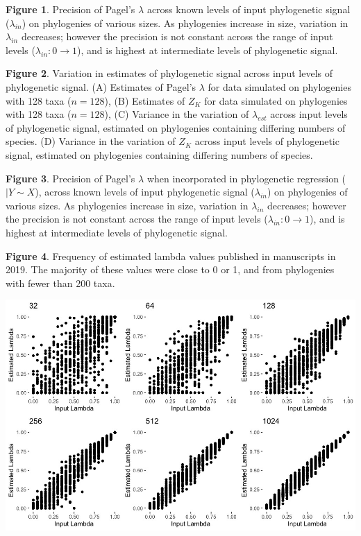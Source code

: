 \documentclass[
]{article}
\begin{document}
\textbf{Figure 1}. Precision of Pagel's \(\lambda\) across known levels
of input phylogenetic signal (\(\lambda_{in}\)) on phylogenies of
various sizes. As phylogenies increase in size, variation in
\(\lambda_{in}\) decreases; however the precision is not constant across
the range of input levels (\(\lambda_{in}: 0 \to 1\)), and is highest at
intermediate levels of phylogenetic signal. \hfill\break

\textbf{Figure 2}. Variation in estimates of phylogenetic signal across
input levels of phylogenetic signal. (A) Estimates of Pagel's
\(\lambda\) for data simulated on phylogenies with 128 taxa (\(n=128\)),
(B) Estimates of \(Z_K\) for data simulated on phylogenies with 128 taxa
(\(n=128\)), (C) Variance in the variation of \(\lambda_{est}\) across
input levels of phylogenetic signal, estimated on phylogenies containing
differing numbers of species. (D) Variance in the variation of \(Z_K\)
across input levels of phylogenetic signal, estimated on phylogenies
containing differing numbers of species. \hfill\break

\textbf{Figure 3}. Precision of Pagel's \(\lambda\) when incorporated in
phylogenetic regression (\(|Y\sim X\)), across known levels of input
phylogenetic signal (\(\lambda_{in}\)) on phylogenies of various sizes.
As phylogenies increase in size, variation in \(\lambda_{in}\)
decreases; however the precision is not constant across the range of
input levels (\(\lambda_{in}: 0 \to 1\)), and is highest at intermediate
levels of phylogenetic signal. \hfill\break

\textbf{Figure 4}. Frequency of estimated lambda values published in
manuscripts in 2019. The majority of these values were close to 0 or 1,
and from phylogenies with fewer than 200 taxa.

\newpage

\includegraphics[width=0.95\linewidth]{Fig1}
\end{document}
